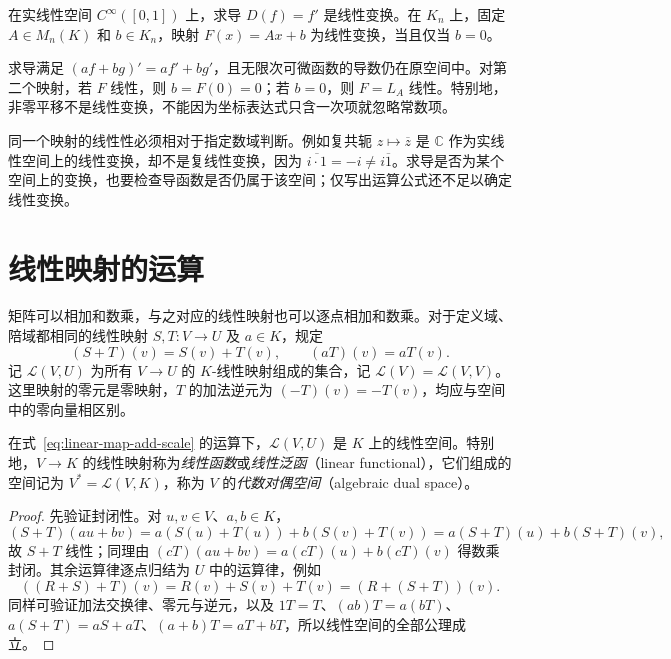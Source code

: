 \begin{example}
在实线性空间 $C^\infty([0,1])$ 上，求导 $D(f)=f'$ 是线性变换。在 $K_n$ 上，固定 $A\in M_n(K)$ 和 $b\in K_n$，映射 $F(x)=Ax+b$ 为线性变换，当且仅当 $b=0$。
\end{example}

\begin{solve}
求导满足 $(af+bg)'=af'+bg'$，且无限次可微函数的导数仍在原空间中。对第二个映射，若 $F$ 线性，则 $b=F(0)=0$；若 $b=0$，则 $F=L_A$ 线性。特别地，非零平移不是线性变换，不能因为坐标表达式只含一次项就忽略常数项。
\end{solve}

\begin{notealert}[type=caution,title={先明确数域与空间}]
同一个映射的线性性必须相对于指定数域判断。例如复共轭 $z\mapsto\overline z$ 是 $\mathbb C$ 作为实线性空间上的线性变换，却不是复线性变换，因为 $\overline{i\cdot1}=-i\ne i\overline1$。求导是否为某个空间上的变换，也要检查导函数是否仍属于该空间；仅写出运算公式还不足以确定线性变换。
\end{notealert}

\section{线性映射的运算}
\label{sec:linear-map-operations}

矩阵可以相加和数乘，与之对应的线性映射也可以逐点相加和数乘。对于定义域、陪域都相同的线性映射 $S,T:V\to U$ 及 $a\in K$，规定
\begin{equation}
\label{eq:linear-map-add-scale}
    (S+T)(v)=S(v)+T(v),\qquad (aT)(v)=aT(v).
\end{equation}
记 $\mathcal L(V,U)$ 为所有 $V\to U$ 的 $K$-线性映射组成的集合，记 $\mathcal L(V)=\mathcal L(V,V)$。这里映射的零元是零映射，$T$ 的加法逆元为 $(-T)(v)=-T(v)$，均应与空间中的零向量相区别。

\begin{proposition}
\label{prop:linear-map-space}
在式~\eqref{eq:linear-map-add-scale} 的运算下，$\mathcal L(V,U)$ 是 $K$ 上的线性空间。特别地，$V\to K$ 的线性映射称为\emph{线性函数}或\emph{线性泛函}（linear functional），它们组成的空间记为 $V^*=\mathcal L(V,K)$，称为 $V$ 的\emph{代数对偶空间}（algebraic dual space）。
\end{proposition}

\begin{proof}
先验证封闭性。对 $u,v\in V$、$a,b\in K$，
\[
    (S+T)(au+bv)
    =a(S(u)+T(u))+b(S(v)+T(v))
    =a(S+T)(u)+b(S+T)(v),
\]
故 $S+T$ 线性；同理由 $(cT)(au+bv)=a(cT)(u)+b(cT)(v)$ 得数乘封闭。其余运算律逐点归结为 $U$ 中的运算律，例如
\[
    ((R+S)+T)(v)=R(v)+S(v)+T(v)=(R+(S+T))(v).
\]
同样可验证加法交换律、零元与逆元，以及 $1T=T$、$(ab)T=a(bT)$、$a(S+T)=aS+aT$、$(a+b)T=aT+bT$，所以线性空间的全部公理成立。
\end{proof}

